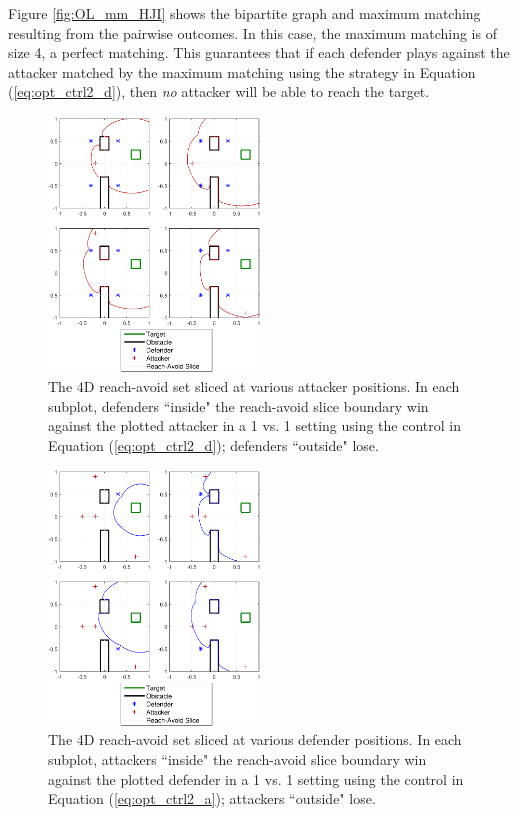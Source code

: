 Figure \ref{fig:OL_mm_HJI} shows the bipartite graph and maximum matching resulting from the pairwise outcomes. In this case, the maximum matching is of size 4, a perfect matching. This guarantees that if each defender plays against the attacker matched by the maximum matching using the strategy in Equation (\ref{eq:opt_ctrl2_d}), then \textit{no} attacker will be able to reach the target.

\begin{figure}
	\centering
	\includegraphics[width=0.5\textwidth]{"fig/OLGame_pw_results_HJI_fixA"}
	\caption{The 4D reach-avoid set sliced at various attacker positions. In each subplot, defenders ``inside" the reach-avoid slice boundary win against the plotted attacker in a 1 vs. 1 setting using the control in Equation (\ref{eq:opt_ctrl2_d}); defenders ``outside" lose.}
	\label{fig:OL_pw_HJIA}
\end{figure}

\begin{figure}
	\centering
	\includegraphics[width=0.5\textwidth]{"fig/OLGame_pw_results_HJI_fixD"}
	\caption{The 4D reach-avoid set sliced at various defender positions. In each subplot, attackers ``inside" the reach-avoid slice boundary win against the plotted defender in a 1 vs. 1 setting using the control in Equation (\ref{eq:opt_ctrl2_a}); attackers ``outside" lose.}
	\label{fig:OL_pw_HJID}
\end{figure}

